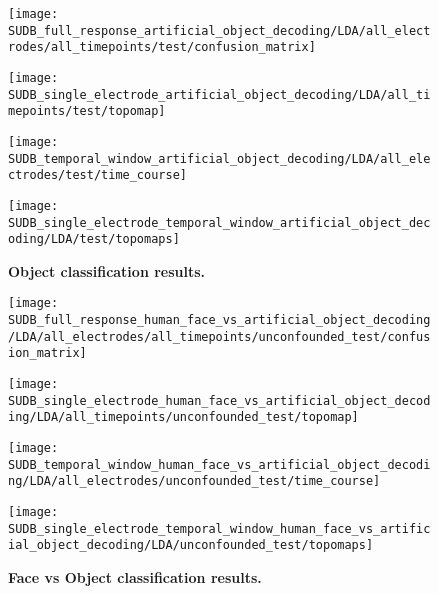 \begin{figure}
    \begin{minipage}[b]{0.32\columnwidth}
        \texttt{[image: SUDB\_full\_response\_artificial\_object\_decoding/LDA/all\_electrodes/all\_timepoints/test/confusion\_matrix]}
    \end{minipage}
    \begin{minipage}[b]{0.32\columnwidth}
        \texttt{[image: SUDB\_single\_electrode\_artificial\_object\_decoding/LDA/all\_timepoints/test/topomap]}
    \end{minipage}
    \begin{minipage}[b]{0.32\columnwidth}
        \texttt{[image: SUDB\_temporal\_window\_artificial\_object\_decoding/LDA/all\_electrodes/test/time\_course]}
    \end{minipage}
    \begin{minipage}{\columnwidth}
        \texttt{[image: SUDB\_single\_electrode\_temporal\_window\_artificial\_object\_decoding/LDA/test/topomaps]}
    \end{minipage}
    \caption{\textbf{Object classification results.}}
\end{figure}

\begin{figure}
    \begin{minipage}[b]{0.32\columnwidth}
        \texttt{[image: SUDB\_full\_response\_human\_face\_vs\_artificial\_object\_decoding/LDA/all\_electrodes/all\_timepoints/unconfounded\_test/confusion\_matrix]}
    \end{minipage}
    \begin{minipage}[b]{0.32\columnwidth}
        \texttt{[image: SUDB\_single\_electrode\_human\_face\_vs\_artificial\_object\_decoding/LDA/all\_timepoints/unconfounded\_test/topomap]}
    \end{minipage}
    \begin{minipage}[b]{0.32\columnwidth}
        \texttt{[image: SUDB\_temporal\_window\_human\_face\_vs\_artificial\_object\_decoding/LDA/all\_electrodes/unconfounded\_test/time\_course]}
    \end{minipage}
    \begin{minipage}{\columnwidth}
        \texttt{[image: SUDB\_single\_electrode\_temporal\_window\_human\_face\_vs\_artificial\_object\_decoding/LDA/unconfounded\_test/topomaps]}
    \end{minipage}
    \caption{\textbf{Face vs Object classification results.}}
\end{figure}

